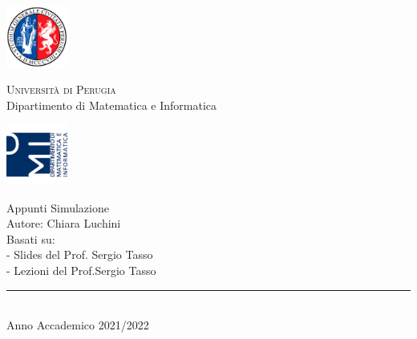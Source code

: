 
\thispagestyle{empty} %

	\noindent %
	\includegraphics[width=0.15\textwidth]{img/logoUniPg}
	\begin{minipage}[b]{0.7\textwidth}
		\centering
		{\Large{\textsc{Universit{\`a} di Perugia}}}\\
		\vspace{0.4 em}
		{\large {Dipartimento di Matematica e Informatica}}
		\vspace{0.6 em}
	\end{minipage}%
	\includegraphics[width=0.15\textwidth]{img/logoDMI}
	
	\vspace{8 em}

	\begin{center}
		

	
		{\Huge{Appunti Simulazione}}\\
		\vspace{2 em}
		{\large { Autore: Chiara Luchini}}\\
		\vspace{5 em}
		{\large {Basati su:}}\\
		{\large {- Slides del Prof. Sergio Tasso}}\\
		{\large {- Lezioni del Prof.Sergio Tasso}}\\

		
		\vspace{6 em}
		\vfill
		
	{\rule{380pt}{.4pt}}\\
		\vspace{1.2 em}
		\large{{Anno Accademico 2021/2022}}
		
		
		
		
	\end{center}


